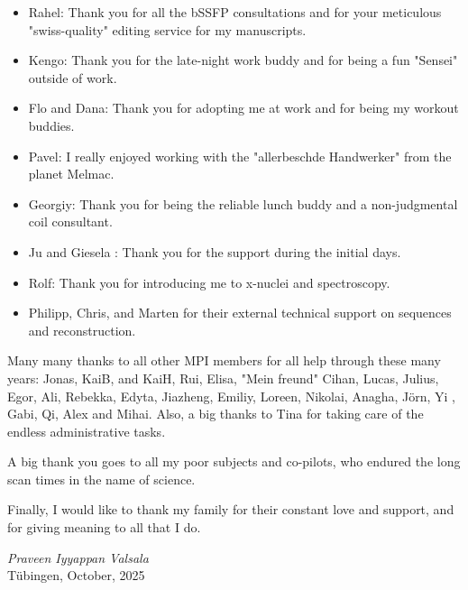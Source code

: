 \begin{itemize}[left=0pt]
	\item[] Rahel: Thank you for all the bSSFP consultations and for your meticulous "swiss-quality" editing service for my manuscripts.
	\item[] Kengo: Thank you for the late-night work buddy and for being a fun "Sensei" outside of work. 
	\item[] Flo and Dana: Thank you for adopting me at work and for being my workout buddies.
	\item[] Pavel: I really enjoyed working with the "allerbeschde Handwerker" from the planet Melmac.
	\item[] Georgiy: Thank you for being the reliable lunch buddy and a non-judgmental coil consultant.
	\item[] Ju and Giesela : Thank you for the support during the initial days.
	\item[] Rolf: Thank you for introducing me to x-nuclei and spectroscopy.
	\item[] Philipp, Chris, and Marten for their external technical support on sequences and reconstruction.
\end{itemize}

Many many thanks to all other MPI members for all help through these many years: Jonas, KaiB, and KaiH, Rui, Elisa, "Mein freund" Cihan, Lucas, Julius, Egor, Ali, Rebekka, Edyta, Jiazheng, Emiliy, Loreen, Nikolai, Anagha, J\"orn, Yi , Gabi, Qi, Alex and Mihai. Also, a big thanks to Tina for taking care of the endless administrative tasks.

A big thank you goes to all my poor subjects and co-pilots, who endured the long scan times in the name of science.

Finally, I would like to thank my family for their constant love and support, and for giving meaning to all that I do.

\begin{flushright}
  \textit{Praveen Iyyappan Valsala}\\
  T\"ubingen, October, 2025
\end{flushright}

